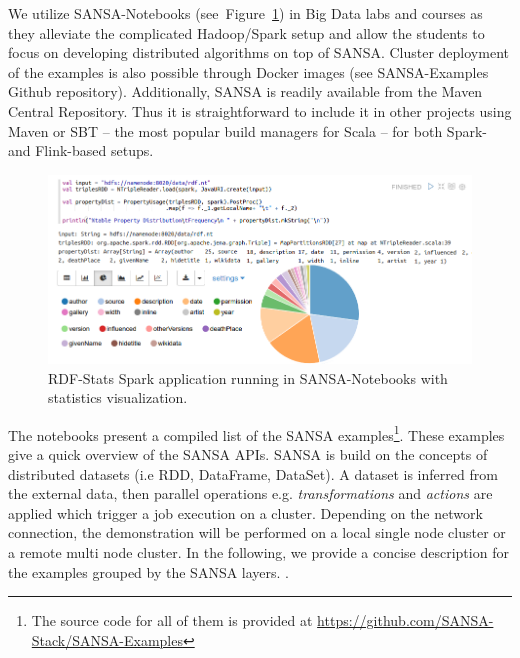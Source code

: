We utilize SANSA-Notebooks (see~Figure~\ref{fig:notebooks}) in Big Data labs and courses as they alleviate the complicated Hadoop/Spark setup and allow the students to focus on developing distributed algorithms on top of SANSA. 
Cluster deployment of the examples is also possible through Docker images (see SANSA-Examples Github repository). 
Additionally, SANSA is readily available from the Maven Central Repository. 
Thus it is straightforward to include it in other projects using Maven or SBT -- the most popular build managers for Scala -- for both Spark- and Flink-based setups. 

\begin{figure}
    \centering
    \includegraphics[width=.9\textwidth]{images/7_implemenation_and_usecases/RDF-Statistics_withoutlangTAG-cropped.png}
    \caption{RDF-Stats Spark application running in SANSA-Notebooks with statistics visualization.}
    \label{fig:notebooks}
\end{figure}

The notebooks present a compiled list of the SANSA examples\footnote{\scriptsize{The source code for all of them is provided at \url{https://github.com/SANSA-Stack/SANSA-Examples}}}.
These examples give a quick overview of the SANSA APIs.
SANSA is build on the concepts of distributed datasets (i.e RDD, DataFrame, DataSet). 
A dataset is inferred from the external data, then parallel operations e.g. \textit{transformations} and \textit{actions} are applied which trigger a job execution on a cluster.
Depending on the network connection, the demonstration will be performed on a local single node cluster or a remote multi node cluster.
In the following, we provide a concise description for the examples grouped by the SANSA layers.
.

